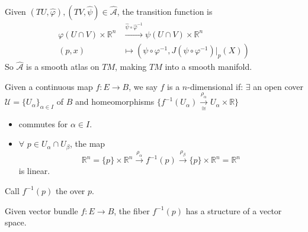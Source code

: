 Given  $ (TU,\hat{\varphi}),(TV,\hat{\psi})\in \hat{\mathcal{A}} $, the transition function is 
\begin{align}
    \varphi(U\cap V)\times\mathbb{R}^n&\xrightarrow{\hat{\psi}\circ\hat{\varphi}^{-1}}\psi(U\cap V)\times \mathbb{R}^n\\
    (p,x)&\mapsto (\psi\circ\varphi^{-1},J(\psi\circ \varphi^{-1})|_p(X))
\end{align}   
So  $ \hat{\mathcal{A}} $ is a smooth atlas on  $ TM  $, making  $ TM  $ into a smooth manifold.
\begin{definition}
    Given a continuous map  $ f:E\rightarrow B $, we say  $ f $ is a  $ n $-dimensional  if: $ \exists $ an open cover  $ \mathcal{U}=\{U_\alpha\}_{\alpha\in I} $ of  $ B $ and homeomorphisms  $ \{f^{-1}(U_\alpha)\xrightarrow[\cong ]{\rho_\alpha}U_\alpha\times \mathbb{R}\} $ \st   
    \tikzset{external/export=false}
    \begin{itemize}
        \item {}
        commutes for  $ \alpha\in I $.

        \item  $ \forall  $  $ p\in U_\alpha\cap U_\beta $, the map 
        \[\mathbb{R}^n=\{p\}\times\mathbb{R}^n\xrightarrow{\rho_\alpha}f^{-1}(p)\xrightarrow{\rho_\beta}\{p\}\times \mathbb{R}^n=\mathbb{R}^n\] 
        is linear.
    \end{itemize}
    \tikzset{external/export=true}
    Call  $ f^{-1}(p)  $  the  over  $ p $. 
\end{definition} 
\begin{proposition}
    Given vector bundle  $ f:E\rightarrow B $, the fiber  $ f^{-1}(p) $ has a structure of a vector space.  
\end{proposition}